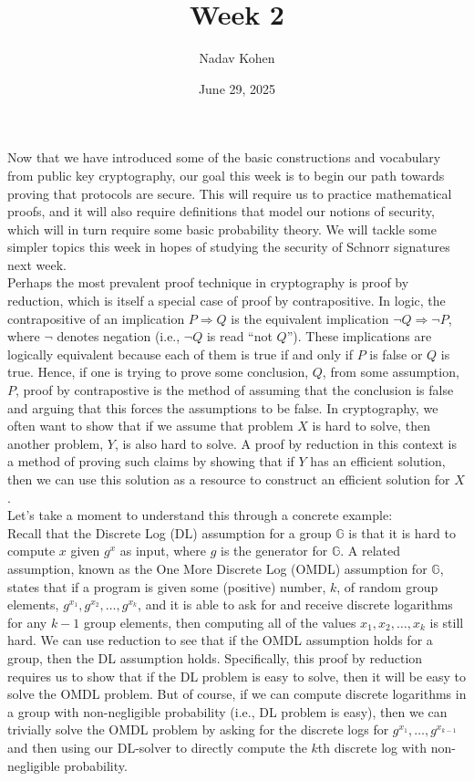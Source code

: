 \documentclass[12pt]{article}
\newcommand{\G}[0]{\mathbb{G}}
\theoremstyle{definition}
\theoremstyle{remark}
\theoremstyle{definition}
\begin{document}
\title{Week 2}
\author{Nadav Kohen}
\date{June 29, 2025}
\maketitle

Now that we have introduced some of the basic constructions and vocabulary from public key cryptography, our goal this week is to begin our path towards proving that protocols are secure. This will require us to practice mathematical proofs, and it will also require definitions that model our notions of security, which will in turn require some basic probability theory. We will tackle some simpler topics this week in hopes of studying the security of Schnorr signatures next week.\\

Perhaps the most prevalent proof technique in cryptography is proof by reduction, which is itself a special case of proof by contrapositive. In logic, the contrapositive of an implication $P\Rightarrow Q$ is the equivalent implication $\neg Q\Rightarrow \neg P$, where $\neg$ denotes negation (i.e., $\neg Q$ is read ``not $Q$''). These implications are logically equivalent because each of them is true if and only if $P$ is false or $Q$ is true. Hence, if one is trying to prove some conclusion, $Q$, from some assumption, $P$, proof by contrapostive is the method of assuming that the conclusion is false and arguing that this forces the assumptions to be false. In cryptography, we often want to show that if we assume that problem $X$ is hard to solve, then another problem, $Y$, is also hard to solve. A proof by reduction in this context is a method of proving such claims by showing that if $Y$ has an efficient solution, then we can use this solution as a resource to construct an efficient solution for $X$.\\

Let's take a moment to understand this through a concrete example:\\

Recall that the Discrete Log (DL) assumption for a group $\G$ is that it is hard to compute $x$ given $g^x$ as input, where $g$ is the generator for $\G$. A related assumption, known as the One More Discrete Log (OMDL) assumption for $\G$, states that if a program is given some (positive) number, $k$, of random group elements, $g^{x_1},g^{x_2},\ldots, g^{x_k}$, and it is able to ask for and receive discrete logarithms for any $k-1$ group elements, then computing all of the values $x_1, x_2,\ldots, x_k$ is still hard. We can use reduction to see that if the OMDL assumption holds for a group, then the DL assumption holds. Specifically, this proof by reduction requires us to show that if the DL problem is easy to solve, then it will be easy to solve the OMDL problem. But of course, if we can compute discrete logarithms in a group with non-negligible probability (i.e., DL problem is easy), then we can trivially solve the OMDL problem by asking for the discrete logs for $g^{x_1},\ldots, g^{x_{k-1}}$ and then using our DL-solver to directly compute the $k$th discrete log with non-negligible probability.
\end{document}
